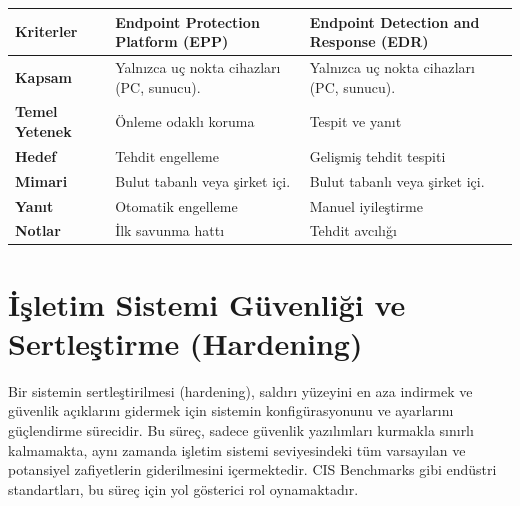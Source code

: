 \begin{tabular}{|p{4cm}|p{6cm}|p{4cm}|}
\hline
\hline
\textbf{Kriterler} & \textbf{Endpoint Protection Platform (EPP)} & \textbf{Endpoint Detection and Response (EDR)}  \\
\hline
\hline
\textbf{Kapsam} & Yalnızca uç nokta cihazları (PC, sunucu). & Yalnızca uç nokta cihazları (PC, sunucu).  \\
\hline
\hline
\textbf{Temel Yetenek} & Önleme odaklı koruma & Tespit ve yanıt  \\
\hline
\hline
\textbf{Hedef} & Tehdit engelleme & Gelişmiş tehdit tespiti  \\
\hline
\hline
\textbf{Mimari} & Bulut tabanlı veya şirket içi. & Bulut tabanlı veya şirket içi.  \\
\hline
\hline
\textbf{Yanıt} & Otomatik engelleme & Manuel iyileştirme  \\
\hline
\hline
\textbf{Notlar} & İlk savunma hattı & Tehdit avcılığı  \\
\hline
\hline
\hline
\end{tabular}

\section{İşletim Sistemi Güvenliği ve Sertleştirme (Hardening)}

Bir sistemin sertleştirilmesi (hardening), saldırı yüzeyini en aza indirmek ve güvenlik açıklarını gidermek için sistemin konfigürasyonunu ve ayarlarını güçlendirme sürecidir. Bu süreç, sadece güvenlik yazılımları kurmakla sınırlı kalmamakta, aynı zamanda işletim sistemi seviyesindeki tüm varsayılan ve potansiyel zafiyetlerin giderilmesini içermektedir. CIS Benchmarks gibi endüstri standartları, bu süreç için yol gösterici rol oynamaktadır.

